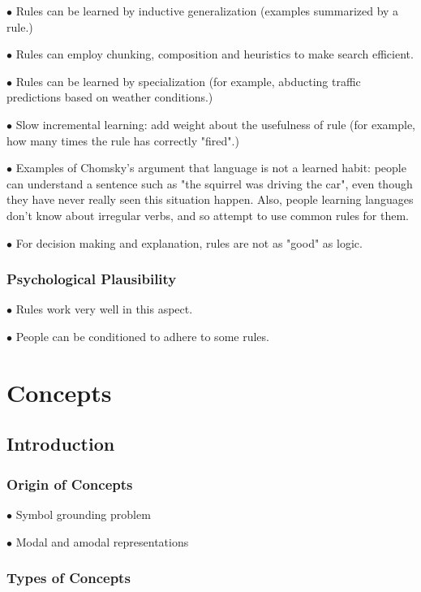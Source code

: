 \documentclass[english,openany]{book}
\begin{document}
$\bullet$ Rules can be learned by inductive generalization (examples summarized by a rule.)

$\bullet$ Rules can employ chunking, composition and heuristics to make search efficient.

$\bullet$ Rules can be learned by specialization (for example, abducting traffic predictions based on weather conditions.)

$\bullet$ Slow incremental learning: add weight about the usefulness of rule (for example, how many times the rule has correctly "fired".)

$\bullet$ Examples of Chomsky's argument that language is not a learned habit: people can understand a sentence such as "the squirrel was driving the car", even though they have never really seen this situation happen. Also, people learning languages don't know about irregular verbs, and so attempt to use common rules for them.

$\bullet$ For decision making and explanation, rules are not as "good" as logic.

\subsection{Psychological Plausibility}

$\bullet$ Rules work very well in this aspect.

$\bullet$ People can be conditioned to adhere to some rules.

\chapter{Concepts}

\section{Introduction}

\subsection{Origin of Concepts}

$\bullet$ Symbol grounding problem

$\bullet$ Modal and amodal representations

\subsection{Types of Concepts}
\end{document}
